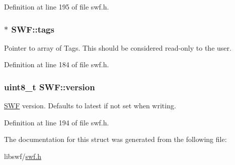 Definition at line 195 of file swf.\-h.

\hypertarget{struct_s_w_f_a27238e7bdf4bb8961159b4c4a8913580}{
\subsubsection[{tags}]{$\ast$ S\-W\-F\-::tags}}\label{struct_s_w_f_a27238e7bdf4bb8961159b4c4a8913580}
Pointer to array of Tags. This should be considered read-\/only to the user. 

Definition at line 184 of file swf.\-h.

\hypertarget{struct_s_w_f_aafcab8c367361cc18461b683b9278ad0}{
\subsubsection[{version}]{\setlength{\rightskip}{0pt plus 5cm}uint8\-\_\-t S\-W\-F\-::version}}\label{struct_s_w_f_aafcab8c367361cc18461b683b9278ad0}


\hyperlink{struct_s_w_f}{S\-W\-F} version. Defaults to latest if not set when writing. 



Definition at line 194 of file swf.\-h.



The documentation for this struct was generated from the following file\-:\begin{DoxyCompactItemize}
\item 
libswf/\hyperlink{swf_8h}{swf.\-h}\end{DoxyCompactItemize}
